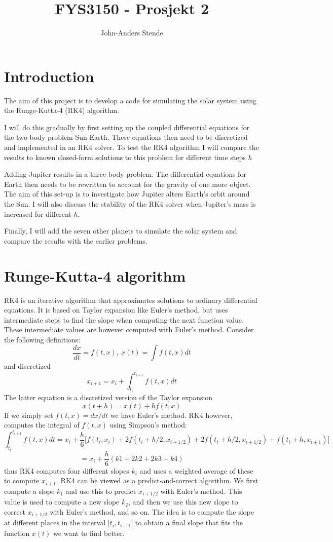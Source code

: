 \documentclass[a4paper,12pt, english]{article}
\title{FYS3150 - Prosjekt 2}
\author{John-Anders Stende}
\begin{document}
\section*{Introduction}

The aim of this project is to develop a code for simulating the solar system using the Runge-Kutta-4 (RK4) algorithm.

I will do this gradually by first setting up the coupled differential equations for the two-body problem Sun-Earth. These equations then need to be discretized and implemented in an RK4 solver. To test the RK4 algorithm I will compare the results to known closed-form solutions to this problem for different time steps $h$ 

Adding Jupiter results in a three-body problem. The differential equations for Earth then needs to be rewritten to account for the gravity of one more object. The aim of this set-up is to investigate how Jupiter alters Earth's orbit around the Sun. I will also discuss the stability of the RK4 solver when Jupiter's mass is increased for different $h$.

Finally, I will add the seven other planets to simulate the solar system and compare the results with the earlier problems. 

\section*{Runge-Kutta-4 algorithm}

RK4 is an iterative algorithm that approximates solutions to ordinary differential equations. It is based on Taylor expansion like Euler's method, but uses intermediate steps to find the slope when computing the next function value. These intermediate values are however computed with Euler's method. Consider the following definitions:
\[
\frac{dx}{dt}=f(t,x), \ x(t)=\int f(t,x)dt
\]
and discretized
\[
x_{i+1} = x_i + \int_{t_i}^{t_{i+1}}f(t,x)dt
\]
The latter equation is a discretized version of the Taylor expansion
\[
x(t+h) = x(t) + hf(t,x)
\]
If we simply set $f(t,x) = dx/dt$ we have Euler's method. RK4 however, computes the integral of $f(t,x)$ using Simpson's method:
\[
\int_{t_i}^{t_{i+1}}f(t,x)dt = x_i + \frac{h}{6} \lbrack f(t_i,x_i) + 2f(t_i+h/2,x_{i+1/2}) +
2f(t_i+h/2,x_{i+1/2}) + f(t_i+h,x_{i+1}) \rbrack
\]
\[
= x_i + \frac{h}{6} (k1 + 2k2 + 2k3 + k4)
\]
thus RK4 computes four different slopes $k_i$ and uses a weighted average of these to compute $x_{i+1}$. RK4 can be viewed as a predict-and-correct algorithm. We first compute a slope $k_1$ and use this to predict $x_{i+1/2}$ with Euler's method. This value is used to compute a new slope $k_2$, and then we use this new slope to correct $x_{i+1/2}$ with Euler's method, and so on. The idea is to compute the slope at different places in the interval $\lbrack t_i,t_{i+1} \rbrack$ to obtain a final slope that fits the function $x(t)$ we want to find better.
\end{document}
